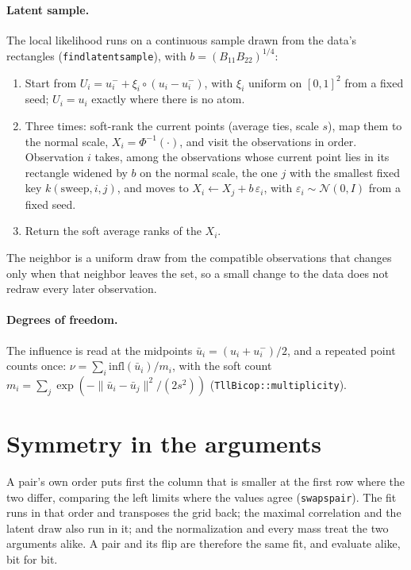 \documentclass[11pt]{article}
\newcommand{\N}{\mathcal{N}}
\newcommand{\codeus}{\textunderscore\allowbreak}
\newcommand{\code}[1]{\begingroup\let\_\codeus\texttt{#1}\endgroup}
\begin{document}
\paragraph{Latent sample.} The local likelihood runs on a continuous sample
drawn from the data's rectangles (\code{find\_latent\_sample}), with
$b = (B_{11} B_{22})^{1/4}$:
\begin{enumerate}
  \item Start from $U_i = u_i^- + \xi_i \circ (u_i - u_i^-)$, with $\xi_i$ uniform
    on $[0, 1]^2$ from a fixed seed; $U_i = u_i$ exactly where there is no
    atom.
  \item Three times: soft-rank the current points (average ties, scale $s$),
    map them to the normal scale, $X_i = \Phi^{-1}(\cdot)$, and visit the
    observations in order. Observation $i$ takes, among the observations whose
    current point lies in its rectangle widened by $b$ on the normal scale,
    the one $j$ with the smallest fixed key $k(\text{sweep}, i, j)$, and moves
    to $X_i \leftarrow X_j + b\, \varepsilon_i$, with $\varepsilon_i \sim
    \N(0, I)$ from a fixed seed.
  \item Return the soft average ranks of the $X_i$.
\end{enumerate}
The neighbor is a uniform draw from the compatible observations that changes
only when that neighbor leaves the set, so a small change to the data does not
redraw every later observation.

\paragraph{Degrees of freedom.} The influence is read at the midpoints
$\bar u_i = (u_i + u_i^-) / 2$, and a repeated point counts once:
$\nu = \sum_i \mathrm{infl}(\bar u_i) / m_i$, with the soft count
$m_i = \sum_j \exp(-\lVert \bar u_i - \bar u_j \rVert^2 / (2 s^2))$
(\code{TllBicop::multiplicity}).

\section{Symmetry in the arguments}
\label{sec:symmetry}

A pair's own order puts first the column that is smaller at the first row
where the two differ, comparing the left limits where the values agree
(\code{swaps\_pair}). The fit runs in that order and transposes the grid back;
the maximal correlation and the latent draw also run in it; and the
normalization and every mass treat the two arguments alike. A pair and its
flip are therefore the same fit, and evaluate alike, bit for bit.
\end{document}
